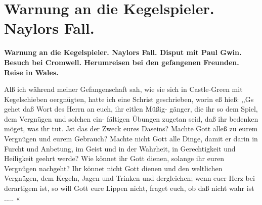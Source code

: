 
\chapter[Warnung an die Kegelspieler. Naylors Fall.]{Warnung an die Kegelspieler. Naylors Fall.}

\begin{center}
\textbf{Warnung an die Kegelspieler. Naylors Fall. Disput mit Paul
Gwin. Besuch bei Cromwell. Herumreisen bei den gefangenen
Freunden. Reise in Wales.}
\end{center}


Alß ich während meiner Gefangenschaft sah, wie sie sich in
Castle-Green mit Kegelschieben oergnügten, hatte ich eine Schrist
geschrieben, worin eß hieß:
,,Gs gehet daß Wort des Herrn an euch, ihr eitlen Müßig-
gänger, die ihr so dem Spiel, dem Vergnügen und solchen ein-
fältigen Übungen zugetan seid, daß ihr bedenken möget, was ihr
tut. Jst das der Zweck eures Daseins? Machte Gott alleß zu
eurem Vergnügen und eurem Gebrauch? Machte nicht Gott alle
Dinge, damit er darin in Furcht und Anbetung, im Geist und in
der Wahrheit, in Gerechtigkeit und Heiligkeit geehrt werde? Wie
könnet ihr Gott dienen, solange ihr euren Vergnügen nachgeht?
Ihr könnet nicht Gott dienen und den weltlichen Vergnügen, dem
Kegeln, Jagen und Trinken und dergleichen; wenn euer Herz bei
derartigem ist, so will Gott eure Lippen nicht, fraget euch, ob daß
nicht wahr ist ..... «


